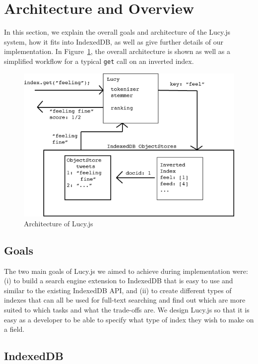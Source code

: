 \documentclass{vldb}
\begin{document}
\section{Architecture and Overview}

In this section, we explain the overall goals and architecture of the Lucy.js system, how it fits into IndexedDB, as well as give further details of our implementation. In Figure~\ref{system}, the overall architecture is shown as well as a simplified workflow for a typical \texttt{get} call on an inverted index.


\begin{figure}[]
	\includegraphics[scale=.43]{arch}
	\caption{Architecture of Lucy.js}
	\label{system}
\end{figure}

\subsection{Goals}

The two main goals of Lucy.js we aimed to achieve during implementation were: (i) to build a search engine extension to IndexedDB that is easy to use and similar to the existing IndexedDB API, and (ii) to create different types of indexes that can all be used for full-text searching and find out which are more suited to which tasks and what the trade-offs are. We design Lucy.js so that it is easy as a developer to be able to specify what type of index they wish to make on a field.

\subsection{IndexedDB}
\end{document}
